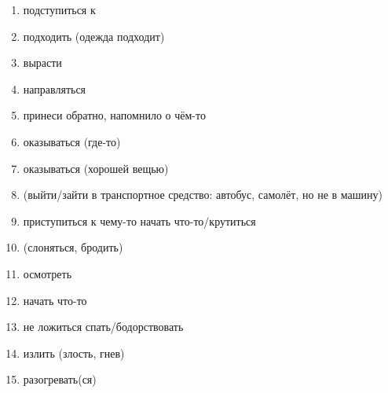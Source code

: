 \begin{enumerate}
    \item {} подступиться к
    \item {} подходить (одежда подходит)
    \item {} вырасти
    \item {} направляться
    \item {} принеси обратно, напомнило о чём-то
    \item {} оказываться (где-то)
    \item {} оказываться (хорошей вещью)
    \item {} (выйти/зайти в транспортное средство: автобус, самолёт, но не в машину)
    \item {} приступиться к чему-то начать что-то/крутиться
    \item {} (слоняться, бродить)
    \item {} осмотреть
    \item {} начать что-то
    \item {} не ложиться спать/бодорствовать
    \item {} излить (злость, гнев) 
    \item {} разогревать(ся)
\end{enumerate}

